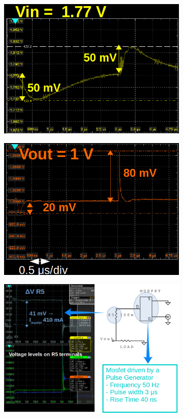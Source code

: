 \begin{figure}
\begin{subfigure}{.5\textwidth}
  \centering
  \includegraphics[width=.96\linewidth]{Immagini/zoomTransientTest1}
  \caption{ }
  \label{TransientTest:sfig1}
\end{subfigure}%
\begin{subfigure}{.5\textwidth}
  \centering
  \includegraphics[width=.95\linewidth]{Immagini/zoomTransientTest2}
  \caption{ }
  \label{TransientTest:sfig2}
\end{subfigure}
\begin{subfigure}{\textwidth}
  \centering
  \includegraphics[width=0.9\linewidth]{Immagini/zoomTransientTest3bis}

\end{subfigure}
\end{figure}
